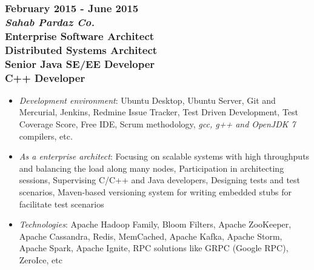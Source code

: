 \documentclass[10pt,a4paper]{article}
\begin{document}
  \setlength{\leftskip}{0pt}
  \setlength{\rightskip}{0cm}
	  
\subsubsection{{February 2015 - June 2015} \\ \textnormal {\textit {Sahab Pardaz Co.}} \\ {Enterprise Software Architect \\ Distributed Systems Architect \\ Senior Java SE/EE Developer \\ C++ Developer}}
	\setlength{\leftskip}{0.5cm}
  \setlength{\rightskip}{1cm}
  \begin{itemize}
    \setlength{\rightskip}{1cm}
    \setlength\itemsep{0em}
    \item \small \textit {Development environment}: Ubuntu Desktop, Ubuntu Server, Git and Mercurial, Jenkins, Redmine Issue Tracker, Test Driven Development, Test Coverage Score, Free IDE, Scrum methodology, \textit {gcc, g++ and OpenJDK 7} compilers, etc.
    \item \small \textit {As a enterprise architect}: Focusing on scalable systems with high throughputs and balancing the load along many nodes, Participation in architecting sessions, Supervising C/C++ and Java developers, Designing tests and test scenarios, Maven-based versioning system for writing embedded stubs for facilitate test scenarios
    \item \small \textit {Technologies}: Apache Hadoop Family, Bloom Filters, Apache ZooKeeper, Apache Cassandra, Redis, MemCached, Apache Kafka, Apache Storm, Apache Spark, Apache Ignite, RPC solutions like GRPC (Google RPC), ZeroIce, etc
  \end{itemize}
  \setlength{\leftskip}{0pt}
  \setlength{\rightskip}{0cm}
	  
\end{document}
